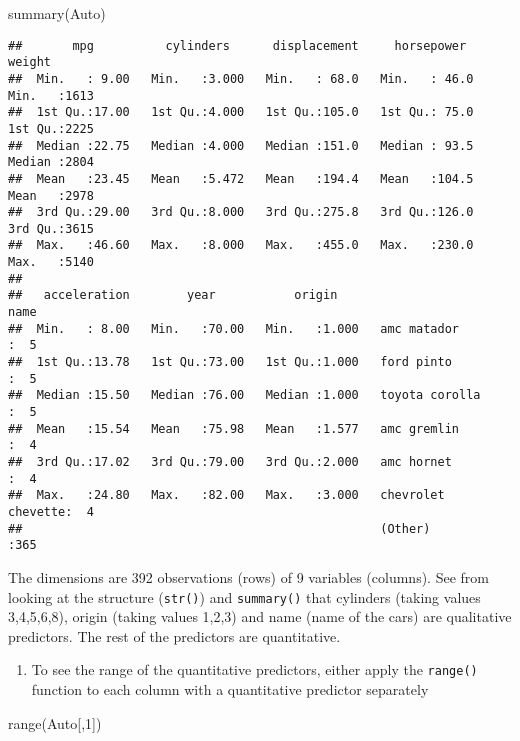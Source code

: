 \documentclass[
]{article}
\newenvironment{Shaded}{\begin{snugshade}}{\end{snugshade}}
\newcommand{\DecValTok}[1]{\textcolor[rgb]{0.00,0.00,0.81}{#1}}
\newcommand{\FunctionTok}[1]{\textcolor[rgb]{0.00,0.00,0.00}{#1}}
\newcommand{\NormalTok}[1]{#1}
\providecommand{\tightlist}{%
  \setlength{\itemsep}{0pt}\setlength{\parskip}{0pt}}
\begin{document}
\begin{Shaded}
\begin{Highlighting}[]
\FunctionTok{summary}\NormalTok{(Auto)}
\end{Highlighting}
\end{Shaded}

\begin{verbatim}
##       mpg          cylinders      displacement     horsepower        weight    
##  Min.   : 9.00   Min.   :3.000   Min.   : 68.0   Min.   : 46.0   Min.   :1613  
##  1st Qu.:17.00   1st Qu.:4.000   1st Qu.:105.0   1st Qu.: 75.0   1st Qu.:2225  
##  Median :22.75   Median :4.000   Median :151.0   Median : 93.5   Median :2804  
##  Mean   :23.45   Mean   :5.472   Mean   :194.4   Mean   :104.5   Mean   :2978  
##  3rd Qu.:29.00   3rd Qu.:8.000   3rd Qu.:275.8   3rd Qu.:126.0   3rd Qu.:3615  
##  Max.   :46.60   Max.   :8.000   Max.   :455.0   Max.   :230.0   Max.   :5140  
##                                                                                
##   acceleration        year           origin                      name    
##  Min.   : 8.00   Min.   :70.00   Min.   :1.000   amc matador       :  5  
##  1st Qu.:13.78   1st Qu.:73.00   1st Qu.:1.000   ford pinto        :  5  
##  Median :15.50   Median :76.00   Median :1.000   toyota corolla    :  5  
##  Mean   :15.54   Mean   :75.98   Mean   :1.577   amc gremlin       :  4  
##  3rd Qu.:17.02   3rd Qu.:79.00   3rd Qu.:2.000   amc hornet        :  4  
##  Max.   :24.80   Max.   :82.00   Max.   :3.000   chevrolet chevette:  4  
##                                                  (Other)           :365
\end{verbatim}

The dimensions are 392 observations (rows) of 9 variables (columns). See
from looking at the structure (\texttt{str()}) and \texttt{summary()}
that cylinders (taking values 3,4,5,6,8), origin (taking values 1,2,3)
and name (name of the cars) are qualitative predictors. The rest of the
predictors are quantitative.

\begin{enumerate}
\def\labelenumi{\alph{enumi})}
\setcounter{enumi}{1}
\tightlist
\item
  To see the range of the quantitative predictors, either apply the
  \texttt{range()} function to each column with a quantitative predictor
  separately
\end{enumerate}

\begin{Shaded}
\begin{Highlighting}[]
\FunctionTok{range}\NormalTok{(Auto[,}\DecValTok{1}\NormalTok{])}
\end{Highlighting}
\end{Shaded}
\end{document}
